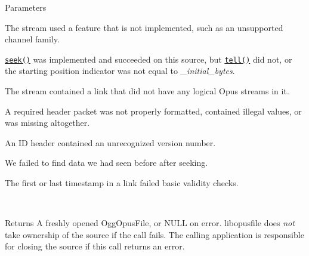 \begin{DoxyParams}[1]{Parameters}
\begin{DoxyDescription}
\item[\hyperlink{group__error__codes_gaeea27378f826033ca23584d8403665d3}{O\+P\+\_\+\+E\+I\+M\+PL} ]The stream used a feature that is not implemented, such as an unsupported channel family. 
\item[\hyperlink{group__error__codes_gae0879acafe9cc0ab72462d291fdb6fb6}{O\+P\+\_\+\+E\+I\+N\+V\+AL} ]{\ttfamily \href{#op_seek_func}{\tt seek()}} was implemented and succeeded on this source, but {\ttfamily \href{#op_tell_func}{\tt tell()}} did not, or the starting position indicator was not equal to {\itshape \+\_\+initial\+\_\+bytes}. 
\item[\hyperlink{group__error__codes_gafca3ae244d24e10b2851c77379453220}{O\+P\+\_\+\+E\+N\+O\+T\+F\+O\+R\+M\+AT} ]The stream contained a link that did not have any logical Opus streams in it. 
\item[\hyperlink{group__error__codes_ga534f1b45c8733a2928434e482b38869f}{O\+P\+\_\+\+E\+B\+A\+D\+H\+E\+A\+D\+ER} ]A required header packet was not properly formatted, contained illegal values, or was missing altogether. 
\item[\hyperlink{group__error__codes_gaa9ae4494f623f3c0609f0b4bd99b8f32}{O\+P\+\_\+\+E\+V\+E\+R\+S\+I\+ON} ]An ID header contained an unrecognized version number. 
\item[\hyperlink{group__error__codes_gaf7b58a439a471366e9eb5b8f2a8cd041}{O\+P\+\_\+\+E\+B\+A\+D\+L\+I\+NK} ]We failed to find data we had seen before after seeking. 
\item[\hyperlink{group__error__codes_gaf82657fc888f1dcf2e0d8f066b8a6cc7}{O\+P\+\_\+\+E\+B\+A\+D\+T\+I\+M\+E\+S\+T\+A\+MP} ]The first or last timestamp in a link failed basic validity checks. 
\end{DoxyDescription}\\
\hline
\end{DoxyParams}
\begin{DoxyReturn}{Returns}
A freshly opened {\ttfamily Ogg\+Opus\+File}, or {\ttfamily N\+U\+LL} on error. {\ttfamily libopusfile} does {\itshape not} take ownership of the source if the call fails. The calling application is responsible for closing the source if this call returns an error. 
\end{DoxyReturn}
\mbox{\label{group__stream__open__close_ga15866bd0cd7ac77162db3b0428962e75}} 
